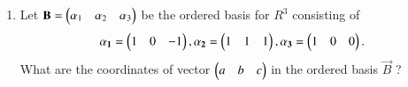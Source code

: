 \renewcommand{\theequation}{\theenumi}
\renewcommand{\thefigure}{\theenumi}
\begin{enumerate}[label=\thesubsection.\arabic*.,ref=\thesubsection.\theenumi]
\item 
Let $\mathbf{B} = \begin{pmatrix}\alpha_1&\alpha_2&\alpha_3\end{pmatrix}$ be the ordered basis for $R^3$ consisting of 
$$\mathbf{\alpha_1} = \begin{pmatrix}1&0&-1\end{pmatrix}, \mathbf{\alpha_2} = \begin{pmatrix}1&1&1\end{pmatrix}, \mathbf{\alpha_3} = \begin{pmatrix}1&0&0\end{pmatrix}.$$
What are the coordinates of vector $\begin{pmatrix}a&b&c\end{pmatrix}$ in the ordered basis $\vec{B}$ ?
%
\\
\solution

\end{enumerate}
